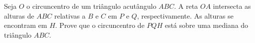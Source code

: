 Seja $O$ o circuncentro de um triângulo acutângulo $ABC$.
A reta $OA$ intersecta as alturas de $ABC$ relativas a $B$ e $C$ em $P$ e $Q$, respectivamente.
As alturas se encontram em $H$.
Prove que o circuncentro de $PQH$ está sobre uma mediana do triângulo $ABC$.
